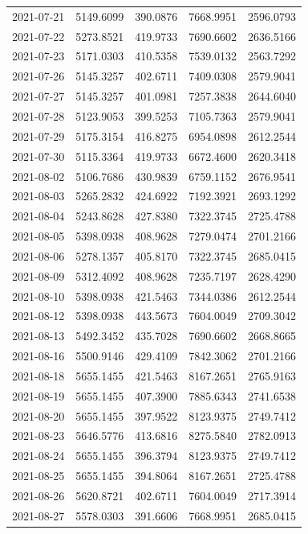 {\begin{longtable}{lllll}
2021-07-21 & 5149.6099 & 390.0876 & 7668.9951 & 2596.0793 \\
2021-07-22 & 5273.8521 & 419.9733 & 7690.6602 & 2636.5166 \\
2021-07-23 & 5171.0303 & 410.5358 & 7539.0132 & 2563.7292 \\
2021-07-26 & 5145.3257 & 402.6711 & 7409.0308 & 2579.9041 \\
2021-07-27 & 5145.3257 & 401.0981 & 7257.3838 & 2644.6040 \\
2021-07-28 & 5123.9053 & 399.5253 & 7105.7363 & 2579.9041 \\
2021-07-29 & 5175.3154 & 416.8275 & 6954.0898 & 2612.2544 \\
2021-07-30 & 5115.3364 & 419.9733 & 6672.4600 & 2620.3418 \\
2021-08-02 & 5106.7686 & 430.9839 & 6759.1152 & 2676.9541 \\
2021-08-03 & 5265.2832 & 424.6922 & 7192.3921 & 2693.1292 \\
2021-08-04 & 5243.8628 & 427.8380 & 7322.3745 & 2725.4788 \\
2021-08-05 & 5398.0938 & 408.9628 & 7279.0474 & 2701.2166 \\
2021-08-06 & 5278.1357 & 405.8170 & 7322.3745 & 2685.0415 \\
2021-08-09 & 5312.4092 & 408.9628 & 7235.7197 & 2628.4290 \\
2021-08-10 & 5398.0938 & 421.5463 & 7344.0386 & 2612.2544 \\
2021-08-12 & 5398.0938 & 443.5673 & 7604.0049 & 2709.3042 \\
2021-08-13 & 5492.3452 & 435.7028 & 7690.6602 & 2668.8665 \\
2021-08-16 & 5500.9146 & 429.4109 & 7842.3062 & 2701.2166 \\
2021-08-18 & 5655.1455 & 421.5463 & 8167.2651 & 2765.9163 \\
2021-08-19 & 5655.1455 & 407.3900 & 7885.6343 & 2741.6538 \\
2021-08-20 & 5655.1455 & 397.9522 & 8123.9375 & 2749.7412 \\
2021-08-23 & 5646.5776 & 413.6816 & 8275.5840 & 2782.0913 \\
2021-08-24 & 5655.1455 & 396.3794 & 8123.9375 & 2749.7412 \\
2021-08-25 & 5655.1455 & 394.8064 & 8167.2651 & 2725.4788 \\
2021-08-26 & 5620.8721 & 402.6711 & 7604.0049 & 2717.3914 \\
2021-08-27 & 5578.0303 & 391.6606 & 7668.9951 & 2685.0415 \\

\end{longtable}}
